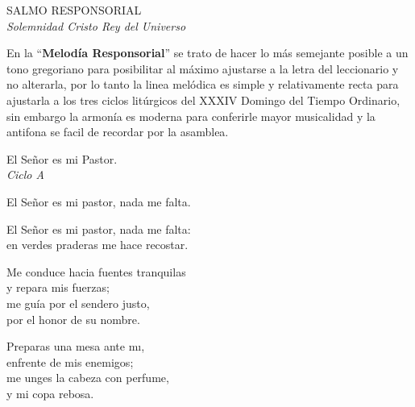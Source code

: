 \documentclass[12pt, letterpaper]{report}
\begin{document}



    \begin{center}
      {\large SALMO RESPONSORIAL}\\
      \textit{Solemnidad Cristo Rey del Universo}
    \end{center}

    En la ``\textbf{Melod\'ia Responsorial}'' se trato de hacer lo m\'as semejante posible a un tono gregoriano para posibilitar al m\'aximo ajustarse a la letra del leccionario y no alterarla, por lo tanto la linea mel\'odica es simple y relativamente recta para ajustarla a los tres ciclos litúrgicos del XXXIV Domingo del Tiempo Ordinario, sin embargo la armon\'ia es moderna para conferirle mayor musicalidad y la antifona se facil de recordar por la asamblea.

    \noindent
    {\large El Señor es mi Pastor.}\\
    \textit{Ciclo A}

    \noindent
    El Se\~nor es mi pastor, nada me falta.

    \noindent
    El Se\~nor es mi pastor, nada me falta:\\
    en verdes praderas me hace recostar.

    \noindent
    Me conduce hacia fuentes tranquilas\\
    y repara mis fuerzas;\\
    me gu\'ia por el sendero justo,\\
    por el honor de su nombre.

    \noindent
    Preparas una mesa ante m\i,\\
    enfrente de mis enemigos;\\
    me unges la cabeza con perfume,\\
    y mi copa rebosa.
\end{document}
